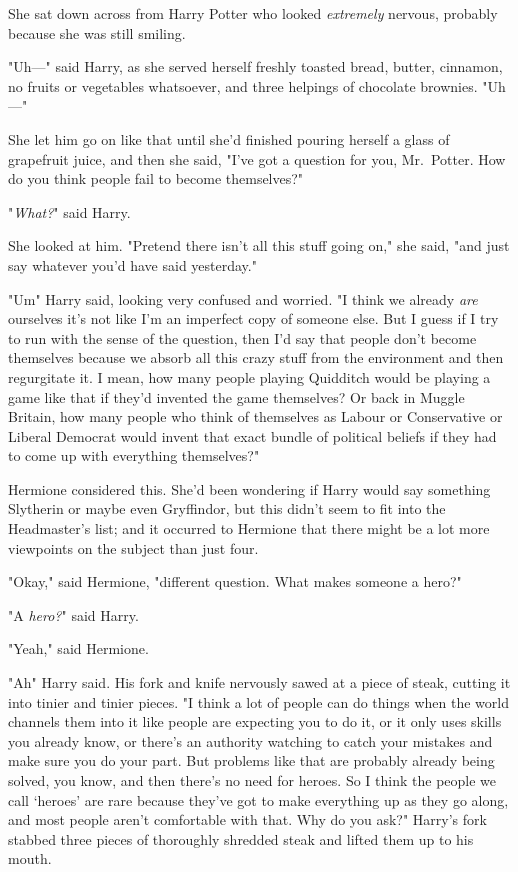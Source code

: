 She sat down across from Harry Potter who looked \emph{extremely} nervous,
probably because she was still smiling.

"Uh---" said Harry, as she served herself freshly toasted bread, butter,
cinnamon, no fruits or vegetables whatsoever, and three helpings of chocolate
brownies. "Uh---"

She let him go on like that until she'd finished pouring herself a glass of
grapefruit juice, and then she said, "I've got a question for you, Mr.~Potter.
How do you think people fail to become themselves?"

"\emph{What?}" said Harry.

She looked at him. "Pretend there isn't all this stuff going on," she said,
"and just say whatever you'd have said yesterday."

"Um{\el}" Harry said, looking very confused and worried. "I think we already
\emph{are} ourselves{\el} it's not like I'm an imperfect copy of someone
else. But I guess if I try to run with the sense of the question, then I'd say
that people don't become themselves because we absorb all this crazy stuff from
the environment and then regurgitate it. I mean, how many people playing
Quidditch would be playing a game like that if they'd invented the game
themselves? Or back in Muggle Britain, how many people who think of themselves
as Labour or Conservative or Liberal Democrat would invent that exact bundle of
political beliefs if they had to come up with everything themselves?"

Hermione considered this. She'd been wondering if Harry would say something
Slytherin or maybe even Gryffindor, but this didn't seem to fit into the
Headmaster's list; and it occurred to Hermione that there might be a lot more
viewpoints on the subject than just four.

"Okay," said Hermione, "different question. What makes someone a hero?"

"A \emph{hero?}" said Harry.

"Yeah," said Hermione.

"Ah{\el}" Harry said. His fork and knife nervously sawed at a piece of
steak, cutting it into tinier and tinier pieces. "I think a lot of people can
do things when the world channels them into it{\el} like people are
expecting you to do it, or it only uses skills you already know, or there's an
authority watching to catch your mistakes and make sure you do your part. But
problems like that are probably already being solved, you know, and then
there's no need for heroes. So I think the people we call `heroes' are rare
because they've got to make everything up as they go along, and most people
aren't comfortable with that. Why do you ask?" Harry's fork stabbed three
pieces of thoroughly shredded steak and lifted them up to his mouth.

